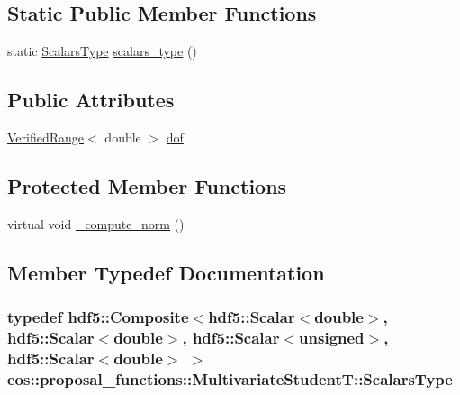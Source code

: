 \subsection*{Static Public Member Functions}
\begin{DoxyCompactItemize}
\item 
static \hyperlink{classeos_1_1hdf5_1_1Composite}{ScalarsType} \hyperlink{classeos_1_1proposal__functions_1_1MultivariateStudentT_a32ceb99e081791885f277e033c809c83}{scalars\_\-type} ()
\end{DoxyCompactItemize}
\subsection*{Public Attributes}
\begin{DoxyCompactItemize}
\item 
\hyperlink{classeos_1_1VerifiedRange}{VerifiedRange}$<$ double $>$ \hyperlink{classeos_1_1proposal__functions_1_1MultivariateStudentT_addd13294ed7e93125f090a8c9250ea99}{dof}
\end{DoxyCompactItemize}
\subsection*{Protected Member Functions}
\begin{DoxyCompactItemize}
\item 
virtual void \hyperlink{classeos_1_1proposal__functions_1_1MultivariateStudentT_aa44fa5958d242f5aae93c0dfa4cb8d84}{\_\-compute\_\-norm} ()
\end{DoxyCompactItemize}


\subsection{Member Typedef Documentation}
\hypertarget{classeos_1_1proposal__functions_1_1MultivariateStudentT_aab40ca04073f1bfec9378681526aadd8}{
\subsubsection[{ScalarsType}]{\setlength{\rightskip}{0pt plus 5cm}typedef {\bf hdf5::Composite}$<${\bf hdf5::Scalar}$<$double$>$, {\bf hdf5::Scalar}$<$double$>$, {\bf hdf5::Scalar}$<$unsigned$>$, {\bf hdf5::Scalar}$<$double$>$ $>$ {\bf eos::proposal\_\-functions::MultivariateStudentT::ScalarsType}}}
\label{classeos_1_1proposal__functions_1_1MultivariateStudentT_aab40ca04073f1bfec9378681526aadd8}


